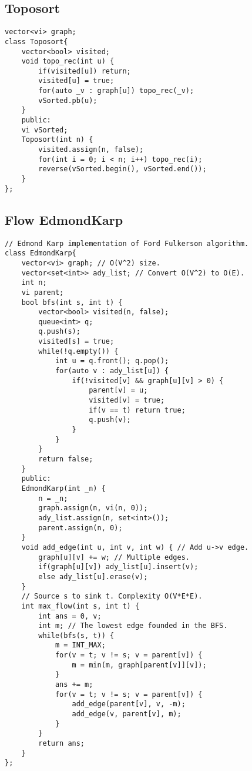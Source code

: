 \documentclass[a4paper]{article}
\begin{document}
\subsection*{Toposort}
\begin{multicols}{2}
\begin{verbatim}
vector<vi> graph;
class Toposort{
    vector<bool> visited;
    void topo_rec(int u) {
        if(visited[u]) return;
        visited[u] = true;
        for(auto _v : graph[u]) topo_rec(_v);
        vSorted.pb(u);
    }
    public:
    vi vSorted;
    Toposort(int n) {
        visited.assign(n, false);
        for(int i = 0; i < n; i++) topo_rec(i);
        reverse(vSorted.begin(), vSorted.end());
    }
};
\end{verbatim}
\end{multicols}
\subsection*{Flow EdmondKarp}
\begin{verbatim}
// Edmond Karp implementation of Ford Fulkerson algorithm.
class EdmondKarp{
    vector<vi> graph; // O(V^2) size.
    vector<set<int>> ady_list; // Convert O(V^2) to O(E).
    int n;
    vi parent;
    bool bfs(int s, int t) {
        vector<bool> visited(n, false);
        queue<int> q;
        q.push(s);
        visited[s] = true;
        while(!q.empty()) {
            int u = q.front(); q.pop();
            for(auto v : ady_list[u]) {
                if(!visited[v] && graph[u][v] > 0) {
                    parent[v] = u;
                    visited[v] = true;
                    if(v == t) return true;
                    q.push(v);
                }
            }
        }
        return false;
    }
    public:
    EdmondKarp(int _n) {
        n = _n;
        graph.assign(n, vi(n, 0));
        ady_list.assign(n, set<int>());
        parent.assign(n, 0);
    }
    void add_edge(int u, int v, int w) { // Add u->v edge.
        graph[u][v] += w; // Multiple edges.
        if(graph[u][v]) ady_list[u].insert(v);
        else ady_list[u].erase(v);
    }
    // Source s to sink t. Complexity O(V*E*E).
    int max_flow(int s, int t) {
        int ans = 0, v;
        int m; // The lowest edge founded in the BFS.
        while(bfs(s, t)) {
            m = INT_MAX;
            for(v = t; v != s; v = parent[v]) {
                m = min(m, graph[parent[v]][v]);
            }
            ans += m;
            for(v = t; v != s; v = parent[v]) {
                add_edge(parent[v], v, -m);
                add_edge(v, parent[v], m);
            }
        }
        return ans;
    }
};
\end{verbatim}
\end{document}
